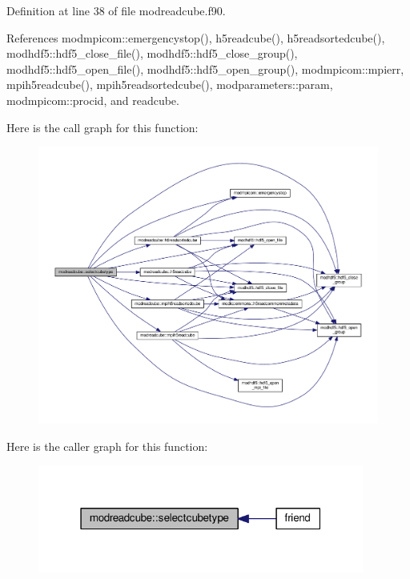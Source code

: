 Definition at line 38 of file modreadcube.\+f90.



References modmpicom\+::emergencystop(), h5readcube(), h5readsortedcube(), modhdf5\+::hdf5\+\_\+close\+\_\+file(), modhdf5\+::hdf5\+\_\+close\+\_\+group(), modhdf5\+::hdf5\+\_\+open\+\_\+file(), modhdf5\+::hdf5\+\_\+open\+\_\+group(), modmpicom\+::mpierr, mpih5readcube(), mpih5readsortedcube(), modparameters\+::param, modmpicom\+::procid, and readcube.



Here is the call graph for this function\+:\nopagebreak
\begin{figure}[H]
\begin{center}
\leavevmode
\includegraphics[width=350pt]{namespacemodreadcube_a9c2a086c3d23dcb886817558a3592218_cgraph}
\end{center}
\end{figure}




Here is the caller graph for this function\+:\nopagebreak
\begin{figure}[H]
\begin{center}
\leavevmode
\includegraphics[width=304pt]{namespacemodreadcube_a9c2a086c3d23dcb886817558a3592218_icgraph}
\end{center}
\end{figure}




